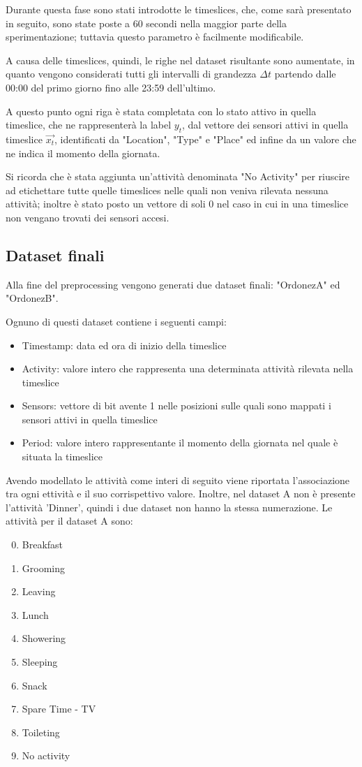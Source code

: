 \documentclass[10pt,a4paper]{article}
\begin{document}
	Durante questa fase sono stati introdotte le timeslices, che, come sarà presentato in seguito, sono state poste a 60 secondi nella maggior parte della sperimentazione; tuttavia questo parametro è facilmente modificabile.

	A causa delle timeslices, quindi, le righe nel dataset risultante sono aumentate, in quanto vengono considerati tutti gli intervalli di grandezza $ \Delta t $ partendo dalle 00:00 del primo giorno fino alle 23:59 dell'ultimo.

	A questo punto ogni riga è stata completata con lo stato attivo in quella timeslice, che ne rappresenterà la label $ y_{t} $, dal vettore dei sensori attivi in quella timeslice $  \vec{x_{t}} $, identificati da "Location", "Type" e "Place" ed infine da un valore che ne indica il momento della giornata.

	Si ricorda che è stata aggiunta un'attività denominata "No Activity" per riuscire ad etichettare tutte quelle timeslices nelle quali non veniva rilevata nessuna attività; inoltre è stato posto un vettore di soli 0 nel caso in cui in una timeslice non vengano trovati dei sensori accesi.

	\subsection{Dataset finali}
	Alla fine del preprocessing vengono generati due dataset finali: "OrdonezA" ed "OrdonezB".

	Ognuno di questi dataset contiene i seguenti campi:

	\begin{itemize}
		\item Timestamp: data ed ora di inizio della timeslice
		\item Activity: valore intero che rappresenta una determinata attività rilevata nella timeslice
		\item Sensors: vettore di bit avente 1 nelle posizioni sulle quali sono mappati i sensori attivi in quella timeslice
		\item Period: valore intero rappresentante il momento della giornata nel quale è situata la timeslice
	\end{itemize}
	\clearpage

	Avendo modellato le attività come interi di seguito viene riportata l'associazione tra ogni ettività e il suo corrispettivo valore. Inoltre, nel dataset A non è presente l'attività 'Dinner', quindi i due dataset non hanno la stessa numerazione.
	Le attività per il dataset A sono:
	\begin{enumerate}
	\setcounter{enumi}{-1}
	    \item Breakfast
	    \item Grooming
	    \item Leaving
	    \item Lunch
	    \item Showering
	    \item Sleeping
	    \item Snack
	    \item Spare Time - TV
	    \item Toileting
	    \item No activity
	\end{enumerate}
\end{document}
